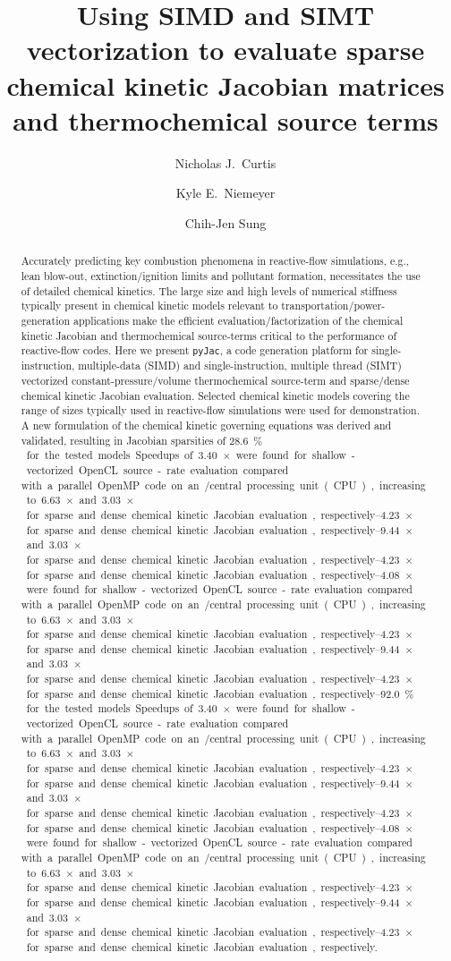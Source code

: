\documentclass[12pt,number,sort&compress,preprint]{elsarticle}
\newcommand{\delete}[1]{\sloppy\cbcolor{RedOrange}\textcolor{RedOrange}{\cbdelete\sout{#1}}}
\newcommand{\revise}[1]{{\sloppy\textcolor{RoyalPurple}{#1}}}  %
\begin{document}
\begin{frontmatter}

\title{Using SIMD and SIMT vectorization to evaluate sparse chemical kinetic Jacobian matrices and thermochemical source terms}

\author[1]{Nicholas J.~Curtis}
\author[2]{Kyle E.~Niemeyer}
\author[1]{Chih-Jen Sung}

\address[1]{Department of Mechanical Engineering, University of Connecticut, Storrs, CT 06269, USA}
\address[2]{School of Mechanical, Industrial, and Manufacturing Engineering, Oregon State University, Corvallis, OR 97331, USA}

\begin{abstract}
\revise{Accurately predicting key combustion phenomena in reactive-flow simulations, e.g., lean blow-out, extinction\slash ignition limits and pollutant formation, necessitates the use of detailed chemical kinetics.}
\revise{The large size and high levels of numerical stiffness typically present in chemical kinetic models relevant to transportation\slash power-generation applications make the efficient evaluation\slash factorization of the chemical kinetic Jacobian and thermochemical source-terms critical to the performance of reactive-flow codes.}
\revise{Here we present} \texttt{pyJac}, \revise{a code generation platform} for single-instruction, multiple-data (SIMD) and single-instruction, multiple thread (SIMT) vectorized \revise{constant-pressure\slash volume} thermochemical source-term and sparse\slash dense chemical kinetic Jacobian evaluation.
Selected chemical kinetic models covering the range of sizes typically used in reactive-flow simulations were used for demonstration.
A new formulation of the chemical kinetic governing equations was derived and validated, \revise{resulting in} Jacobian sparsities of \SIrange{28.6}{92.0}{$\percent$} for the tested models.
Speedups of \SIrange{3.40}{4.08}{$\times$} were found for shallow-vectorized OpenCL source-rate evaluation \revise{compared with} a parallel OpenMP code on an \avx/ central processing unit (CPU), increasing to \SIrange{6.63}{9.44}{$\times$} and \SIrange{3.03}{4.23}{$\times$} for sparse and dense chemical kinetic Jacobian evaluation, respectively.

\end{abstract}
\end{frontmatter}
\end{document}
